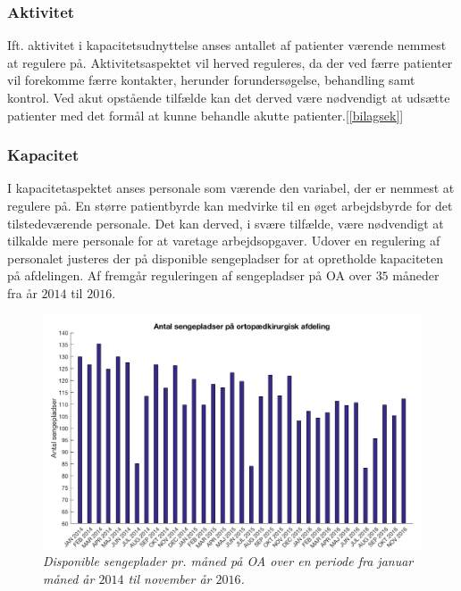 \subsubsection{Aktivitet}
Ift. aktivitet i kapacitetsudnyttelse anses antallet af patienter værende nemmest at regulere på. Aktivitetsaspektet vil herved reguleres, da der ved færre patienter vil forekomme færre kontakter, herunder forundersøgelse, behandling samt kontrol. Ved akut opstående tilfælde kan det derved være nødvendigt at udsætte patienter med det formål at kunne behandle akutte patienter.[\ref{bilagsek}]


\subsubsection{Kapacitet}
I kapacitetaspektet anses personale som værende den variabel, der er nemmest at regulere på. En større patientbyrde kan medvirke til en øget arbejdsbyrde for det tilstedeværende personale. Det kan derved, i svære tilfælde, være nødvendigt at tilkalde mere personale for at varetage arbejdsopgaver. 
Udover en regulering af personalet justeres der på disponible sengepladser for at opretholde kapaciteten på afdelingen. Af  fremgår reguleringen af sengepladser på OA over $35$ måneder fra år $2014$ til $2016$.\cite{Bjerg2016}

\begin{figure}[H] 
\begin{center}
\includegraphics[width=1\textwidth]{figures/sengepladser}
\end{center}
\caption{\textit{Disponible sengeplader pr. måned på OA over en periode fra januar måned år $2014$ til november år $2016$.}\cite{SDS2015}} 
\label{fig:sengepladser} 
\end{figure}

